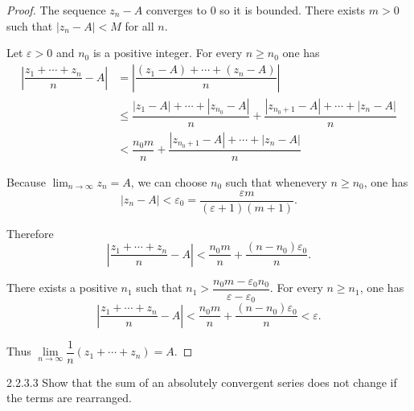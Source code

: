 \begin{proof}
	The sequence \( z_{n} - A \) converges to \( 0 \) so it is bounded. There exists \( m > 0 \) such that \( \left\vert z_{n} - A \right\vert < M \) for all \( n \).

	Let \( \varepsilon > 0 \) and \( n_{0} \) is a positive integer. For every \( n \ge n_{0} \) one has
	\begingroup
	\allowdisplaybreaks%
	\begin{align*}
		\left\vert \dfrac{z_{1} + \cdots + z_{n}}{n} - A \right\vert & = \left\vert \dfrac{(z_{1} - A) + \cdots + (z_{n} - A)}{n} \right\vert                                                                                                                            \\
		                                                             & \le \dfrac{\left\vert z_{1} - A \right\vert + \cdots + \left\vert z_{n_{0}} - A \right\vert}{n} + \dfrac{\left\vert z_{n_{0} + 1} - A \right\vert + \cdots + \left\vert z_{n} - A \right\vert}{n} \\
		                                                             & < \dfrac{n_{0}m}{n} + \dfrac{\left\vert z_{n_{0} + 1} - A \right\vert + \cdots + \left\vert z_{n} - A \right\vert}{n}
	\end{align*}
	\endgroup

	Because \( \lim_{n \to \infty} z_{n} = A  \), we can choose \( n_{0} \) such that whenevery \( n \ge n_{0} \), one has
	\[
		\left\vert z_{n} - A \right\vert < \varepsilon_{0} = \dfrac{\varepsilon m}{(\varepsilon + 1)(m + 1)}.
	\]

	Therefore
	\[
		\left\vert \dfrac{z_{1} + \cdots + z_{n}}{n} - A \right\vert < \dfrac{n_{0}m}{n} + \dfrac{(n - n_{0})\varepsilon_{0}}{n}.
	\]

	There exists a positive \( n_{1} \) such that \( n_{1} > \dfrac{n_{0}m - \varepsilon_{0}n_{0}}{\varepsilon - \varepsilon_{0}} \). For every \( n \ge n_{1} \), one has
	\[
		\left\vert \dfrac{z_{1} + \cdots + z_{n}}{n} - A \right\vert < \dfrac{n_{0}m}{n} + \dfrac{(n - n_{0})\varepsilon_{0}}{n} < \varepsilon.
	\]

	Thus \( \lim\limits_{n\to\infty} \dfrac{1}{n}(z_{1} + \cdots + z_{n}) = A \).
\end{proof}

\begin{problem}{2.2.3.3}
Show that the sum of an absolutely convergent series does not change if the terms are rearranged.
\end{problem}


